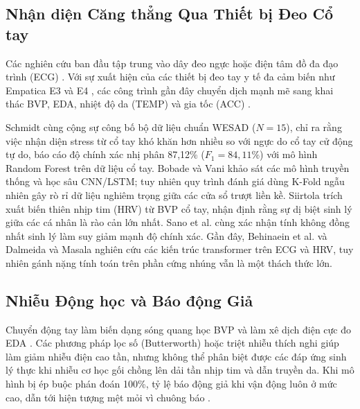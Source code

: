 \documentclass[conference]{IEEEtran}
\begin{document}
\subsection{Nhận diện Căng thẳng Qua Thiết bị Đeo Cổ tay}
Các nghiên cứu ban đầu tập trung vào dây đeo ngực hoặc điện tâm đồ đa đạo trình (ECG) \cite{taskforce1996heart}. Với sự xuất hiện của các thiết bị đeo tay y tế đa cảm biến như Empatica E3 và E4 \cite{garbarino2014empatica}, các công trình gần đây chuyển dịch mạnh mẽ sang khai thác BVP, EDA, nhiệt độ da (TEMP) và gia tốc (ACC) \cite{can2019stress, gjoreski2016continuous}.

Schmidt cùng cộng sự \cite{schmidt2018wesad} công bố bộ dữ liệu chuẩn WESAD ($N=15$), chỉ ra rằng việc nhận diện stress từ cổ tay khó khăn hơn nhiều so với ngực do cổ tay cử động tự do, báo cáo độ chính xác nhị phân 87,12\% ($F_1 = 84,11\%$) với mô hình Random Forest trên dữ liệu cổ tay. Bobade và Vani \cite{bobade2020stress} khảo sát các mô hình truyền thống và học sâu CNN/LSTM; tuy nhiên quy trình đánh giá dùng K-Fold ngẫu nhiên gây rò rỉ dữ liệu nghiêm trọng giữa các cửa sổ trượt liền kề. Siirtola \cite{siirtola2019continuous} trích xuất biến thiên nhịp tim (HRV) từ BVP cổ tay, nhận định rằng sự dị biệt sinh lý giữa các cá nhân là rào cản lớn nhất. Sano et al. \cite{sano2015recognizing} cùng xác nhận tính không đồng nhất sinh lý làm suy giảm mạnh độ chính xác. Gần đây, Behinaein et al. \cite{behinaein2021transformer} và Dalmeida và Masala \cite{dalmeida2021hrv} nghiên cứu các kiến trúc transformer trên ECG và HRV, tuy nhiên gánh nặng tính toán trên phần cứng nhúng vẫn là một thách thức lớn.

\subsection{Nhiễu Động học và Báo động Giả}
Chuyển động tay làm biến dạng sóng quang học BVP và làm xê dịch điện cực đo EDA \cite{tamura2014wearable, zhang2014troika, schumm2008effect}. Các phương pháp lọc số (Butterworth) hoặc triệt nhiễu thích nghi \cite{zhang2014troika} giúp làm giảm nhiễu điện cao tần, nhưng không thể phân biệt được các đáp ứng sinh lý thực khi nhiễu cơ học gối chồng lên dải tần nhịp tim và dẫn truyền da. Khi mô hình bị ép buộc phán đoán 100\%, tỷ lệ báo động giả khi vận động luôn ở mức cao, dẫn tới hiện tượng mệt mỏi vì chuông báo \cite{sendelbach2013alarm}.
\end{document}
